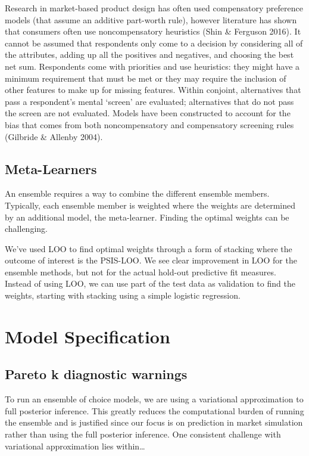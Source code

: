 \documentclass[12pt,titlepage]{mktg-article}
\begin{document}
Research in market-based product design has often used compensatory preference models (that assume an additive part-worth rule), however literature has shown that consumers often use noncompensatory heuristics (Shin \& Ferguson 2016). It cannot be assumed that respondents only come to a decision by considering all of the attributes, adding up all the positives and negatives, and choosing the best net sum. Respondents come with priorities and use heuristics: they might have a minimum requirement that must be met or they may require the inclusion of other features to make up for missing features. Within conjoint, alternatives that pass a respondent's mental `screen' are evaluated; alternatives that do not pass the screen are not evaluated. Models have been constructed to account for the bias that comes from both noncompensatory and compensatory screening rules (Gilbride \& Allenby 2004).

\hypertarget{meta-learners}{%
\subsection{Meta-Learners}\label{meta-learners}}

An ensemble requires a way to combine the different ensemble members. Typically, each ensemble member is weighted where the weights are determined by an additional model, the meta-learner. Finding the optimal weights can be challenging.

We've used LOO to find optimal weights through a form of stacking where the outcome of interest is the PSIS-LOO. We see clear improvement in LOO for the ensemble methods, but not for the actual hold-out predictive fit measures.
Instead of using LOO, we can use part of the test data as validation to find the weights, starting with stacking using a simple logistic regression.

\hypertarget{model-specification}{%
\section{Model Specification}\label{model-specification}}

\hypertarget{pareto-k-diagnostic-warnings}{%
\subsection{Pareto k diagnostic warnings}\label{pareto-k-diagnostic-warnings}}

To run an ensemble of choice models, we are using a variational approximation to full posterior inference. This greatly reduces the computational burden of running the ensemble and is justified since our focus is on prediction in market simulation rather than using the full posterior inference. One consistent challenge with variational approximation lies within\ldots{}
\end{document}
